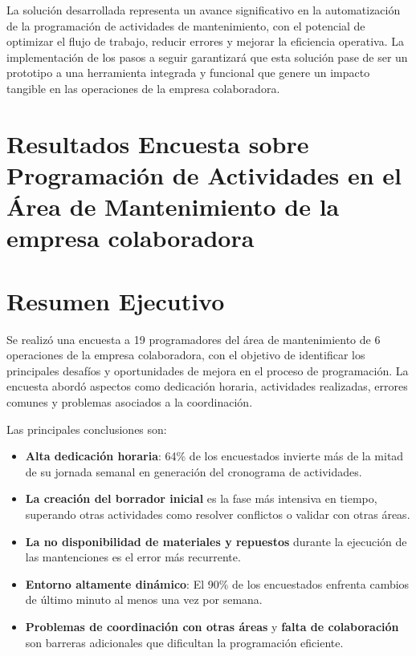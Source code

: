 \documentclass{article}
\begin{document}
La solución desarrollada representa un avance significativo en la automatización de la programación de actividades de mantenimiento, con el potencial de optimizar el flujo de trabajo, reducir errores y mejorar la eficiencia operativa. La implementación de los pasos a seguir garantizará que esta solución pase de ser un prototipo a una herramienta integrada y funcional que genere un impacto tangible en las operaciones de la empresa colaboradora.


\newpage

\begin{appendix}

\section{Resultados Encuesta sobre Programación de Actividades en el Área de Mantenimiento de la empresa colaboradora}
    \label{anexo:encuesta}

    \section*{Resumen Ejecutivo}

    Se realizó una encuesta a 19 programadores del área de mantenimiento de 6 operaciones de la empresa colaboradora, con el objetivo de identificar los principales desafíos y oportunidades de mejora en el proceso de programación. La encuesta abordó aspectos como dedicación horaria, actividades realizadas, errores comunes y problemas asociados a la coordinación.
    
    Las principales conclusiones son:
    
    \begin{itemize}
        \item \textbf{Alta dedicación horaria}: 64\% de los encuestados invierte más de la mitad de su jornada semanal en generación del cronograma de actividades.
        \item \textbf{La creación del borrador inicial} es la fase más intensiva en tiempo, superando otras actividades como resolver conflictos o validar con otras áreas.
        \item \textbf{La no disponibilidad de materiales y repuestos} durante la ejecución de las mantenciones es el error más recurrente.
        \item \textbf{Entorno altamente dinámico}: El 90\% de los encuestados enfrenta cambios de último minuto al menos una vez por semana.
        \item \textbf{Problemas de coordinación con otras áreas} y \textbf{falta de colaboración} son barreras adicionales que dificultan la programación eficiente.
    \end{itemize}
    

\end{appendix}
\end{document}
